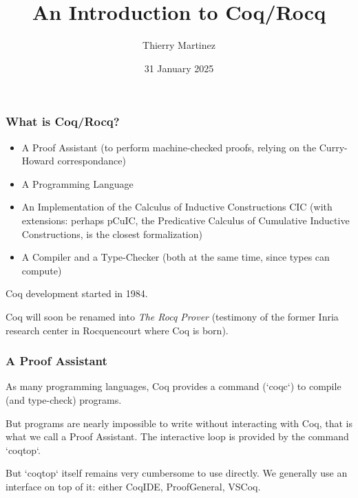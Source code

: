 \documentclass{beamer}
\begin{document}
\begin{frame}
  \title{An Introduction to Coq/Rocq}
  \author{Thierry Martinez}
  \date{31 January 2025}
  \maketitle
\end{frame}
\begin{frame}
  \frametitle{What is Coq/Rocq?}

  \begin{itemize}
  \item A Proof Assistant (to perform machine-checked proofs, relying on the Curry-Howard correspondance)
    \vfill
  \item A Programming Language
    \vfill
  \item An Implementation of the Calculus of Inductive Constructions CIC
    (with extensions: perhaps pCuIC, the Predicative Calculus of Cumulative Inductive Constructions, is the closest formalization)
    \vfill
  \item A Compiler and a Type-Checker (both at the same time, since types can compute)
  \end{itemize}

  \vfill

  Coq development started in 1984.

  \vfill

  Coq will soon be renamed into
  \emph{The Rocq Prover} (testimony of the former Inria research
  center in Rocquencourt where Coq is born).
\end{frame}

\begin{frame}
  \frametitle{A Proof Assistant}

  As many programming languages, Coq provides a command (`coqc`) to compile (and type-check) programs.

  \vfill

  But programs are nearly impossible to write without interacting with
  Coq, that is what we call a Proof Assistant.
  The interactive loop is provided by the command `coqtop`.

  \vfill

  But `coqtop` itself remains very cumbersome to use directly.  We
  generally use an interface on top of it: either CoqIDE,
  ProofGeneral, VSCoq.
\end{frame}
\end{document}
